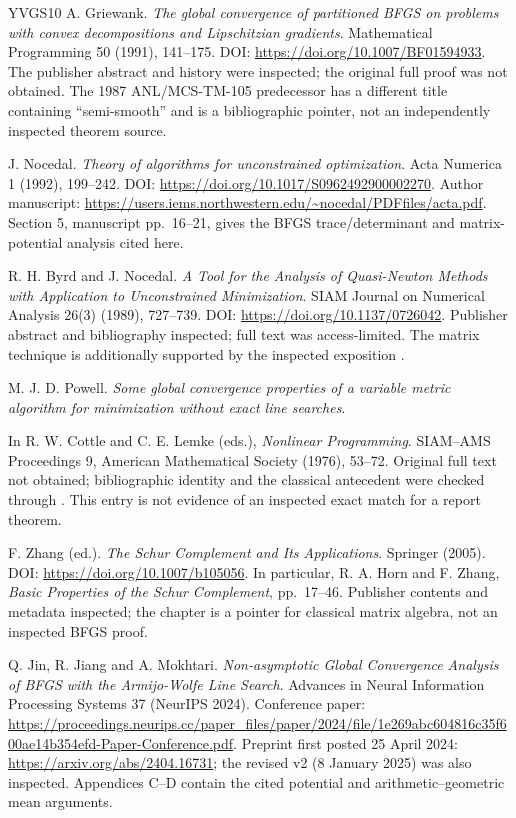 \begin{thebibliography}{YVGS10}
 A. Griewank. \emph{The global convergence of partitioned BFGS on problems with convex decompositions and Lipschitzian gradients}. Mathematical Programming 50 (1991), 141--175. DOI: \url{https://doi.org/10.1007/BF01594933}. The publisher abstract and history were inspected; the original full proof was not obtained. The 1987 ANL/MCS-TM-105 predecessor has a different title containing ``semi-smooth'' and is a bibliographic pointer, not an independently inspected theorem source.

 J. Nocedal. \emph{Theory of algorithms for unconstrained optimization}. Acta Numerica 1 (1992), 199--242. DOI: \url{https://doi.org/10.1017/S0962492900002270}. Author manuscript: \url{https://users.iems.northwestern.edu/~nocedal/PDFfiles/acta.pdf}. Section 5, manuscript pp.\ 16--21, gives the BFGS trace/determinant and matrix-potential analysis cited here.

 R. H. Byrd and J. Nocedal. \emph{A Tool for the Analysis of Quasi-Newton Methods with Application to Unconstrained Minimization}. SIAM Journal on Numerical Analysis 26(3) (1989), 727--739. DOI: \url{https://doi.org/10.1137/0726042}. Publisher abstract and bibliography inspected; full text was access-limited. The matrix technique is additionally supported by the inspected exposition \cite{FND_N92}.

 M. J. D. Powell. \emph{Some global convergence properties of a variable metric algorithm for minimization without exact line searches}.\par
In R. W. Cottle and C. E. Lemke (eds.), \emph{Nonlinear Programming}. SIAM--AMS Proceedings 9, American Mathematical Society (1976), 53--72. Original full text not obtained; bibliographic identity and the classical antecedent were checked through \cite{FND_BN89,FND_N92,GL18}. This entry is not evidence of an inspected exact match for a report theorem.

 F. Zhang (ed.). \emph{The Schur Complement and Its Applications}. Springer (2005). DOI: \url{https://doi.org/10.1007/b105056}. In particular, R. A. Horn and F. Zhang, \emph{Basic Properties of the Schur Complement}, pp.\ 17--46. Publisher contents and metadata inspected; the chapter is a pointer for classical matrix algebra, not an inspected BFGS proof.

 Q. Jin, R. Jiang and A. Mokhtari. \emph{Non-asymptotic Global Convergence Analysis of BFGS with the Armijo-Wolfe Line Search}. Advances in Neural Information Processing Systems 37 (NeurIPS 2024). Conference paper: \url{https://proceedings.neurips.cc/paper_files/paper/2024/file/1e269abc604816c35f600ae14b354efd-Paper-Conference.pdf}. Preprint first posted 25 April 2024: \url{https://arxiv.org/abs/2404.16731}; the revised v2 (8 January 2025) was also inspected. Appendices C--D contain the cited potential and arithmetic--geometric mean arguments.


\end{thebibliography}
